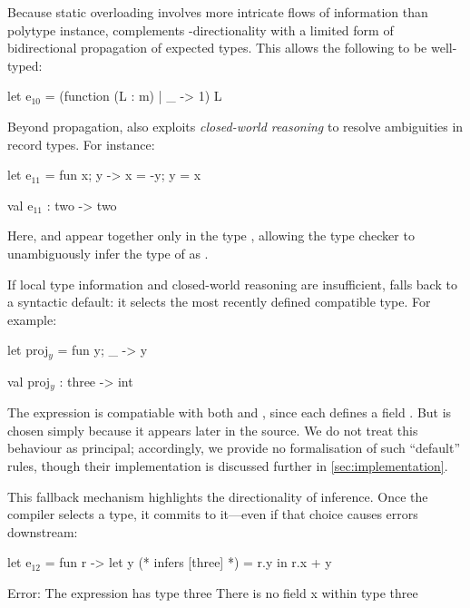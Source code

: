 \documentclass[acmsmall,screen,nonacm]{acmart}
\begin{document}

Because static overloading involves more intricate flows of information than
polytype instance, \OCaml complements \geninst-directionality with a
limited form of bidirectional propagation of expected types. This allows the
following to be well-typed:
\begin{program}[input]
  let e$_{10}$ = (function (L : m) | _ -> 1) L
\end{program}


Beyond propagation, \OCaml also exploits \emph{closed-world reasoning} to resolve
ambiguities in record types. For instance:
\begin{program}[input]
  let e$_{11}$ = fun {x; y} -> {x = -y; y = x}
\end{program}
\programjoin
\begin{program}[output]
  val e$_{11}$ : two -> two
\end{program}
Here,  and  appear together only in the type ,
allowing the type checker to unambiguously infer the type of  as
.


If local type information and closed-world reasoning are insufficient,
\OCaml falls back to a syntactic default: it selects the most recently
defined compatible type. For example:
\begin{program}[input]
  let proj$_y$ = fun {y; _} -> y
\end{program}
\programjoin
\begin{program}[output]
  val proj$_y$ : three -> int
\end{program}
The expression is compatiable with both  and ,
since each defines a field . But  is chosen simply
because it appears later in the source.
We do not treat this behaviour as principal; accordingly, we provide
no formalisation of such ``default'' rules, though their implementation is
discussed further in \cref{sec:implementation}.

This fallback mechanism highlights the directionality of \OCaml inference.
Once the compiler selects a type, it commits to it---even if that choice
causes errors downstream:
\begin{program}[error]
  let e$_{12}$ = fun r -> let y (* infers [three] *) = r.y in r.x + y
\end{program}
\programjoin
\begin{program}[error, style=message]
  Error: The expression has type three
	 There is no field x within type three
\end{program}
\end{document}
